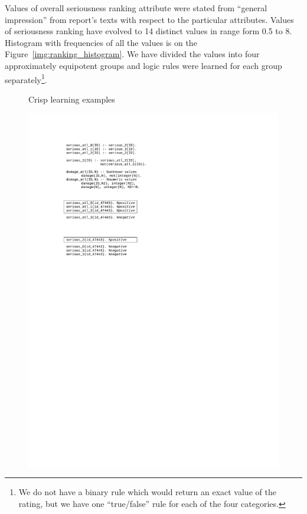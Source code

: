 \documentclass[authoryear,12pt]{elsarticle}
\begin{document}
\noindent Values of overall seriousness ranking attribute were stated from ``general impression'' from report's texts with respect to the particular attributes. %
Values of seriousness ranking have evolved to 14 distinct values in range form 0.5 to 8. 
Histogram with frequencies of all the values is on the Figure~\ref{img:ranking_histogram}.
We have divided the values into four approximately equipotent groups 
and logic rules were learned for each group separately\footnote{We do not have a binary rule which would return an exact value of the rating, but we have one ``true/false'' rule for each of the four categories.}.



\begin{figure}[ht]
\begin{minipage}[b]{0.5\hsize}
	Crisp learning examples\\
	\centerline{\includegraphics[width=\hsize]{img/examples_nonmonot}}

\end{minipage}
\end{figure}
\end{document}
